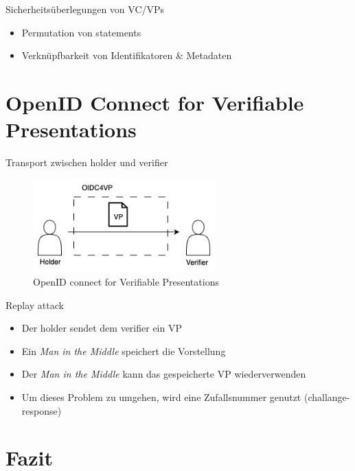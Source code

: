 \documentclass[
	ngerman,%
	authorontitle=true,
	]{bfhbeamer}
\begin{document}
\begin{frame}{Sicherheitsüberlegungen von VC/VPs}
    \begin{itemize}
        \item Permutation von statements
        \item Verknüpfbarkeit von Identifikatoren \& Metadaten
    \end{itemize}
\end{frame}

\section{OpenID Connect for Verifiable Presentations}

\begin{frame}{Transport zwischen holder und verifier}
    \begin{figure}
        \centering
        \includegraphics[width=70mm]{../img/OIDC4VP.png}
        \caption{OpenID connect for Verifiable Presentations}
    \end{figure}
\end{frame}

\begin{frame}{Replay attack}
    \begin{itemize}
        \item Der holder sendet dem verifier ein VP
        \item Ein \textit{Man in the Middle} speichert die Vorstellung
        \item Der \textit{Man in the Middle} kann das gespeicherte VP wiederverwenden
        \item Um dieses Problem zu umgehen, wird eine Zufallsnummer genutzt (challange-response)
    \end{itemize}
\end{frame}

\section{Fazit}
\end{document}
